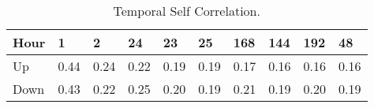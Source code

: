 \begin{table}[H] 
    \caption{Temporal Self Correlation.\label{temp_corr}}
    \begin{tabularx}{\textwidth}{CCCCCCCCCC}
    \toprule
        \textbf{Hour} & 1 & 2 & 24 & 23 & 25 & 168 & 144 & 192 & 48 \\
        \midrule
    Up		& 0.44 & 0.24 & 0.22 & 0.19 & 0.19 & 0.17 & 0.16 & 0.16 & 0.16 \\
    Down		& 0.43 & 0.22 & 0.25 & 0.20 & 0.19 & 0.21 & 0.19 & 0.20 & 0.19 \\
    \bottomrule
    \end{tabularx}
    \end{table}